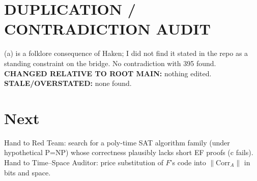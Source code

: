 \documentclass[11pt]{article}
\begin{document}
\section*{DUPLICATION / CONTRADICTION AUDIT}
(a) is a folklore consequence of Haken; I did not find it stated in the repo as a standing constraint on the bridge. No contradiction with 395 found. \textbf{CHANGED RELATIVE TO ROOT MAIN:} nothing edited. \textbf{STALE/OVERSTATED:} none found.

\section*{Next}
Hand to Red Team: search for a poly-time SAT algorithm family (under hypothetical P=NP) whose correctness plausibly lacks short EF proofs (c fails). Hand to Time--Space Auditor: price substitution of $F$'s code into $\|\mathrm{Corr}_A\|$ in bits and space.
\end{document}
